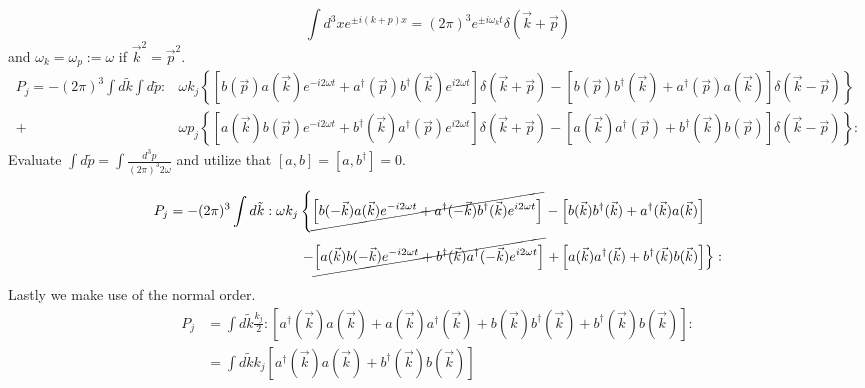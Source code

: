 \begin{equation}
    \int d^3 x e^{\pm i(k + p )x} = (2 \pi)^{3} e^{ \pm i \omega_k t}\delta(\vec{k} + \vec{p})
\end{equation}
and $ \omega_k =  \omega_p := \omega$ if $\vec{k}^2 = \vec{p}^2$. 
\begin{align}
    P_j = -(2\pi)^3 \int d\tilde{k} \int d\tilde{p} :
        &\omega k_j \left\{  \left[ b(\vec{p}) a(\vec{k}) e^{-i 2\omega t}  + a^\dagger(\vec{p}) b^\dagger(\vec{k}) e^{i2\omega t} \right]  \delta(\vec{k}+ \vec{p})
                        - \left[ b(\vec{p}) b^{\dagger}(\vec{k}) + a^\dagger(\vec{p}) a(\vec{k})\right]  \delta(\vec{k}- \vec{p}) 
                    \right\}\\
       +& \omega p_j \left\{ \left[ a(\vec{k}) b(\vec{p}) e^{-i 2\omega t} + b^\dagger(\vec{k}) a^\dagger(\vec{p}) e^{i2\omega t}   \right] \delta(\vec{k}+ \vec{p}) 
                        - \left[ a(\vec{k}) a^{\dagger}(\vec{p}) +b^\dagger(\vec{k}) b(\vec{p}) \right] \delta(\vec{k}- \vec{p}) 
                   \right\}: 
   \end{align}
Evaluate $\int d\tilde{p}= \int \frac{d^3 p}{(2\pi)^3 2 \omega}$ and utilize that $\left[a,b\right] = \left[a, b^\dagger \right] = 0$.


\begin{align}
    P_j = -(2\pi)^3 \int d\tilde{k} :
        \omega k_j \left\{  \cancel{\left[ b(-\vec{k}) a(\vec{k}) e^{-i 2\omega t}  + a^\dagger(-\vec{k}) b^\dagger(\vec{k}) e^{i2\omega t} \right]}
                        \right.&-  \left[ b(\vec{k}) b^{\dagger}(\vec{k}) + a^\dagger(\vec{k}) a(\vec{k})\right]  \\
        - \cancel{\left[ a(\vec{k}) b(-\vec{k}) e^{-i 2\omega t} + b^\dagger(\vec{k}) a^\dagger(-\vec{k}) e^{i2\omega t} \right]} &\left.+  \left[ a(\vec{k}) a^{\dagger}(\vec{k}) +b^\dagger(\vec{k}) b(\vec{k}) \right]   \right\}: 
   \end{align}



Lastly we make use of the normal order.
\begin{align}
    P_j &=  \int d\tilde{k} \frac{k_j}{2}: \left[ a^\dagger(\vec{k}) a(\vec{k})  + a(\vec{k}) a^{\dagger}(\vec{k}) + b(\vec{k}) b^{\dagger}(\vec{k})  + b^\dagger(\vec{k}) b(\vec{k}) 
                \right] :\\
        &=  \int d\tilde{k} k_j \left[ a^\dagger(\vec{k}) a(\vec{k})  + b^\dagger(\vec{k}) b(\vec{k}) 
                \right] \label{res1}
\end{align}


